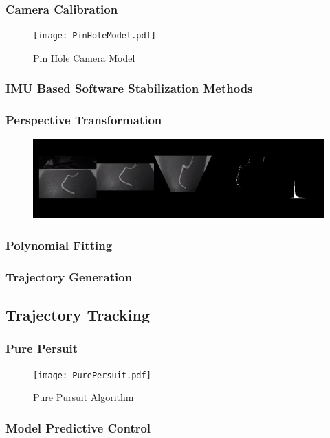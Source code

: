            \subsubsection{Camera Calibration}
            \begin{figure}
            \texttt{[image: PinHoleModel.pdf]}
            \caption{Pin Hole Camera Model}
            \end{figure}

            \subsubsection{IMU Based Software Stabilization Methods}
            \subsubsection{Perspective Transformation}
            \begin{figure}
            \includegraphics[width=\textwidth]{VisionPipelineRes.png}
            \end{figure}
            \subsubsection{Polynomial Fitting}
            \subsubsection{Trajectory Generation}

    \subsection{Trajectory Tracking}
        \subsubsection{Pure Persuit}
        \begin{figure}
            \texttt{[image: PurePersuit.pdf]}
            \caption{Pure Pursuit Algorithm}
        \end{figure}
        \subsubsection{Model Predictive Control}


